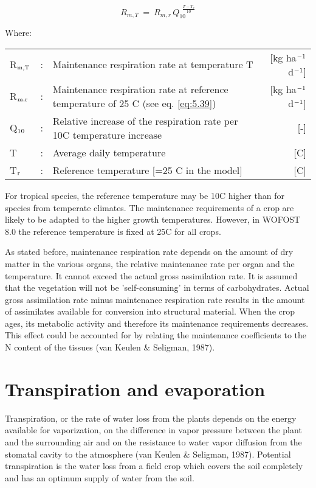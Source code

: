 \begin{equation}
\label{eq:5.40}
R _{m,T} ~=~ R _{m,r} \, Q _{10}^{~~{\frac{T-T _{r} }{10}} }
\end{equation}

Where:\\[5pt]
\begin{tabularx}{\textwidth}{llXr}
	R$_{{\rm m,T}}$ &:& Maintenance respiration rate at 
	temperature T &    [kg ha$^{{\rm -1}}$ d$^{{\rm -1}}$]\\
	R$_{{\rm m,r}}$ &:& Maintenance respiration rate at reference 
	temperature of 25 \degrees C (see eq. \ref{eq:5.39})   &     [kg ha$^{{\rm -1}}$ d$^{{\rm -1}}$]\\
	Q$_{{\rm 10}}$ &:& Relative increase of the respiration rate
	per 10\degrees C temperature increase    &    [-]\\
	T &:& Average daily temperature    &     [\degrees C]\\
	T$_{{\rm r}}$ &:& Reference temperature {\small [=25 \degrees C in 
		the model]}    &    [\degrees C]\\
\end{tabularx}


For tropical species, the reference temperature may be 10\degrees C higher than for species from
temperate climates. The maintenance requirements of a crop are likely to be adapted to
the higher growth temperatures. However, in WOFOST 8.0 the reference temperature is
fixed at 25\degrees C for all crops.

As stated before, maintenance respiration rate depends on the amount of dry matter in the
various organs, the relative maintenance rate per organ and the temperature. It cannot
exceed the actual gross assimilation rate. It is assumed that the vegetation will not be
'self-consuming' in terms of carbohydrates. Actual gross assimilation rate minus 
maintenance respiration rate results in the amount of assimilates available for conversion into
structural material. When the crop ages, its metabolic activity and therefore its
maintenance requirements decreases. This effect could be accounted for by relating 
the maintenance coefficients to the N content of the tissues (van Keulen \& Seligman, 1987).


\section{Transpiration and evaporation}
\label{sec:evapotranspiration}

Transpiration, or the rate of water loss from the plants depends on the energy available
for vaporization, on the difference in vapor pressure between the plant and the surrounding 
air and on the resistance to water vapor diffusion from the stomatal cavity to the
atmosphere (van Keulen \& Seligman, 1987). Potential transpiration is the water loss from
a field crop which covers the soil completely and has an optimum supply of water from
the soil. 

